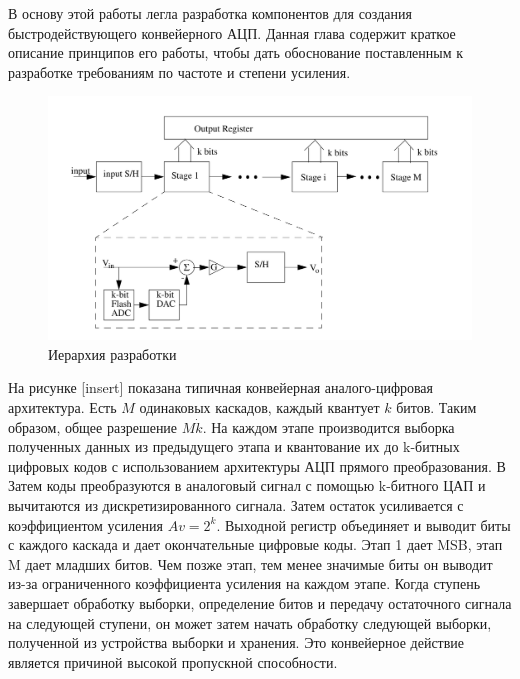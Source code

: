 \documentclass[a4paper,12pt]{article} %
\begin{document}
В основу этой работы легла разработка компонентов для создания быстродействующего конвейерного АЦП. Данная глава содержит краткое описание принципов его работы, чтобы дать обоснование поставленным к разработке требованиям по частоте и степени усиления.


\begin{figure}[H]
    \includegraphics[width=\textwidth]{Pipeline_ADC.png}
    \caption{Иерархия разработки}
    \label{pic:ADC}
\end{figure}

На рисунке [insert] показана типичная конвейерная аналого-цифровая архитектура. Есть $M$ одинаковых каскадов, каждый квантует $k$ битов. Таким образом, общее разрешение $ M\dot k $. На каждом этапе производится выборка полученных данных из предыдущего этапа и квантование их до k-битных цифровых кодов с использованием архитектуры АЦП прямого преобразования. В Затем коды преобразуются в аналоговый сигнал с помощью k-битного ЦАП и вычитаются из дискретизированного сигнала. Затем остаток усиливается с коэффициентом усиления $ Av = 2^k $. Выходной регистр объединяет и  выводит биты с каждого каскада и дает окончательные цифровые коды. Этап 1 дает MSB, этап M дает младших битов. Чем позже этап, тем менее значимые биты он выводит из-за ограниченного коэффициента усиления на каждом этапе. Когда ступень завершает обработку выборки, определение битов и передачу остаточного сигнала на следующей ступени, он может затем начать обработку следующей выборки, полученной из устройства выборки и хранения. Это конвейерное действие является причиной высокой пропускной способности. \cite{pipelineADC}
\end{document}
